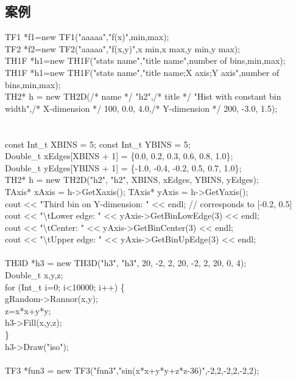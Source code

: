 \documentclass[11pt,a4paper,titlepage]{article}
\begin{document}
\subsection{\kai 案例}
TF1 *f1=new TF1("aaaaa","f(x)",min,max);\\
TF2 *f2=new TF2("aaaaa","f(x,y)",x min,x max,y min,y max);\\
TH1F *h1=new TH1F("stats name","title name",number of bins,min,max);\\
TH1F *h1=new TH1F("stats name","title name;X axis;Y axis",number of bins,min,max);\\
TH2* h = new TH2D(/* name */ "h2",/* title */ "Hist with constant bin width",/* X-dimension */ 100, 0.0, 4.0,/* Y-dimension */ 200, -3.0, 1.5);\\
\\
\\
const Int\_t XBINS = 5; const Int\_t YBINS = 5;\\
Double\_t xEdges[XBINS + 1] = \{0.0, 0.2, 0.3, 0.6, 0.8, 1.0\};\\
Double\_t yEdges[YBINS + 1] = \{-1.0, -0.4, -0.2, 0.5, 0.7, 1.0\};\\
TH2* h = new TH2D("h2", "h2", XBINS, xEdges, YBINS, yEdges);\\
TAxis* xAxis = h->GetXaxis(); TAxis* yAxis = h->GetYaxis();\\
cout << "Third bin on Y-dimension: " << endl; // corresponds to [-0.2, 0.5]\\
cout << "\textbackslash tLower edge: " << yAxis->GetBinLowEdge(3) << endl;\\
cout << "\textbackslash tCenter: " << yAxis->GetBinCenter(3) << endl;\\
cout << "\textbackslash tUpper edge: " << yAxis->GetBinUpEdge(3) << endl;\\
\\
TH3D *h3 = new TH3D("h3", "h3", 20, -2, 2, 20, -2, 2, 20, 0, 4);\\
Double\_t x,y,z;\\
for (Int\_t i=0; i<10000; i++) \{\\
gRandom->Rannor(x,y);\\     
z=x*x+y*y;\\
h3->Fill(x,y,z);\\
\}\\
h3->Draw("iso");\\
\\
TF3 *fun3 = new TF3("fun3","sin(x*x+y*y+z*z-36)",-2,2,-2,2,-2,2);\\
\end{document}
